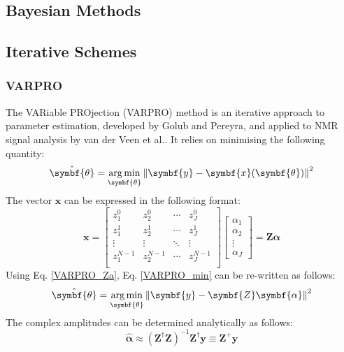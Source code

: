 \subsection{Bayesian Methods}

\subsection{Iterative Schemes}

\subsubsection{VARPRO}
The VARiable PROjection (VARPRO) method is an iterative approach to parameter estimation, developed by Golub and Pereyra\cite{Golub1973}, and applied to NMR signal analysis by van der Veen et al.\cite{VanDerVeen1988}. It relies on minimising the following quantity:
\begin{equation}
  \label{VARPRO_min}
  \hat{\symbf{\theta}} = \argmin_{\symbf{\theta}} \left \lVert \symbf{y} - \symbf{x}(\symbf{\theta}) \right \rVert^2
\end{equation}
The vector $\symbf{x}$ can be expressed in the following format:
\begin{equation}
  \label{VARPRO_Za}
  \symbf{x} =
  \begin{bmatrix}
    z_1^0 & z_2^0 & \cdots & z_J^0\\
    z_1^1 & z_2^1 & \cdots & z_J^1\\
    \vdots & \vdots & \ddots & \vdots\\
    z_1^{N-1} & z_2^{N-1} & \cdots & z_J^{N-1}\\
  \end{bmatrix}
  \begin{bmatrix}
    \alpha_1\\
    \alpha_2\\
    \vdots\\
    \alpha_J
  \end{bmatrix}
  = \symbf{Z}\symbf{\alpha}
\end{equation}
Using Eq. \ref{VARPRO_Za}, Eq. \ref{VARPRO_min} can be re-written as follows:
\begin{equation}
    \hat{\symbf{\theta}} = \argmin_{\symbf{\theta}} \left \lVert \symbf{y} - \symbf{Z}\symbf{\alpha} \right \rVert^2
\end{equation}
The complex amplitudes can be determined analytically as follows:
\begin{equation}
  \label{VARPRO_alpha}
  \hat{\symbf{\alpha}} \approx \left( \symbf{Z}^{\dagger} \symbf{Z} \right)^{-1} \symbf{Z}^{\dagger} \symbf{y} \equiv \symbf{Z}^+ \symbf{y}
\end{equation}
